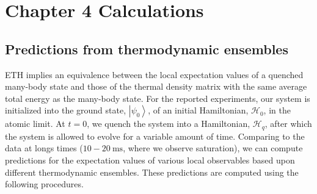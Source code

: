 
%


\chapter{Chapter 4 Calculations}
\label{appendix:Ch4Cal}

\newcommand{\Renyi}{R\'{e}nyi\hspace{1mm}}
\newcommand{\tr}[1]{{\rm{Tr}}{#1}}

\newcommand{\ev}[1]{\left\langle #1\right\rangle}
\newcommand{\bra}[1]{\left\langle #1\right|}
\newcommand{\ket}[1]{\left|#1\right\rangle}
\newcommand{\mat}[2]{\ket{#1}\bra{#2}}
\newcommand{\braket}[2]{\left\langle #1\left|#2\right.\right\rangle}

\newpage{}

\section{Predictions from thermodynamic ensembles}
ETH implies an equivalence between the local expectation values of a quenched many-body state and those of the thermal density matrix with the same average total energy as the many-body state. 
For the reported experiments, our system is initialized into the ground
state, $\ket{\psi_0}$, of an initial Hamiltonian, $\mathcal H_0$, in the
atomic limit. At $t = 0$, we quench the system into a Hamiltonian, $\mathcal
H_q$, after which the system is allowed to evolve for a variable amount of
time. Comparing to the data at longs times ($10-20~\mathrm{ms}$, where we observe saturation), we can
compute predictions for the expectation values of various local observables
based upon different thermodynamic ensembles. These predictions are computed using the following procedures.
 

